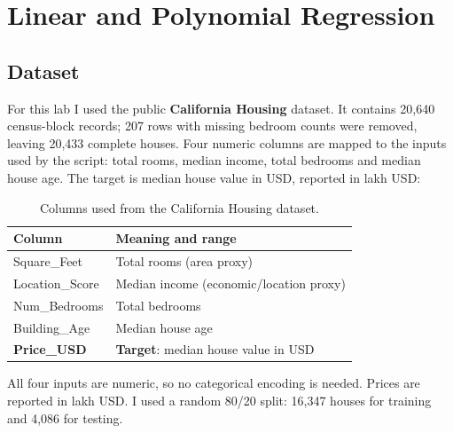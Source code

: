 \chapter{Linear and Polynomial Regression}


\section{Dataset}
For this lab I used the public \textbf{California Housing} dataset. It contains 20,640 census-block
records; 207 rows with missing bedroom counts were removed, leaving 20,433 complete houses. Four
numeric columns are mapped to the inputs used by the script: total rooms, median income, total bedrooms
and median house age. The target is median house value in USD, reported in lakh USD:

\begin{table}[H]
\centering\small
\caption{Columns used from the California Housing dataset.}
\label{tab:lr-columns}
\begin{tabularx}{\linewidth}{@{}l >{\raggedright\arraybackslash}X@{}}
\toprule
\textbf{Column} & \textbf{Meaning and range}\\
\midrule
Square\_Feet & Total rooms (area proxy)\\
Location\_Score & Median income (economic/location proxy)\\
Num\_Bedrooms & Total bedrooms\\
Building\_Age & Median house age\\
\textbf{Price\_USD} & \textbf{Target}: median house value in USD\\
\bottomrule
\end{tabularx}
\end{table}

All four inputs are numeric, so no categorical encoding is needed. Prices are reported in lakh USD. I
used a random 80/20 split: 16,347 houses for training and 4,086 for testing.


